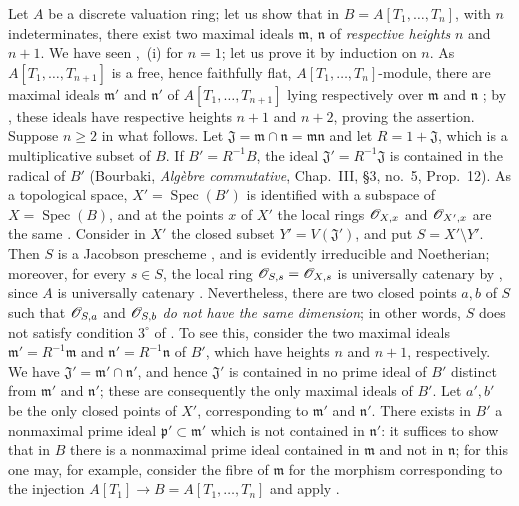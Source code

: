 \begin{env}[10.7.3]
\label{IV.10.7.3}
Let $A$ be a discrete valuation ring; let us show that in $B=A[T_1,\ldots,T_n]$, with $n$ indeterminates, there exist two maximal ideals $\mathfrak{m}$, $\mathfrak{n}$ of \emph{respective heights} $n$ and $n+1$.
We have seen ,~(i) for $n=1$; let us prove it by induction on $n$.
As $A[T_1,\ldots,T_{n+1}]$ is a free, hence faithfully flat, $A[T_1,\ldots,T_n]$-module, there are maximal ideals $\mathfrak{m}'$ and $\mathfrak{n}'$ of $A[T_1,\ldots,T_{n+1}]$ lying respectively over $\mathfrak{m}$ and $\mathfrak{n}$ ; by , these ideals have respective heights $n+1$ and $n+2$, proving the assertion.
Suppose $n\geq 2$ in what follows.
Let $\mathfrak{J}=\mathfrak{m}\cap\mathfrak{n}=\mathfrak{m}\mathfrak{n}$ and let $R=1+\mathfrak{J}$, which is a multiplicative subset of $B$.
If $B'=R^{-1}B$, the ideal $\mathfrak{J}'=R^{-1}\mathfrak{J}$ is contained in the radical of $B'$ (Bourbaki, \emph{Alg\`ebre commutative}, Chap.~III, \S3, no.~5, Prop.~12).
As a topological space, $X'=\operatorname{Spec}(B')$ is identified with a subspace of $X=\operatorname{Spec}(B)$, and at the points $x$ of $X'$ the local rings $\mathscr{O}_{X,x}$ and $\mathscr{O}_{X',x}$ are the same .
Consider in $X'$ the closed subset $Y'=V(\mathfrak{J}')$, and put $S=X'\setminus Y'$.
Then $S$ is a Jacobson prescheme , and is evidently irreducible and Noetherian; moreover, for every $s\in S$, the local ring $\mathscr{O}_{S,s}=\mathscr{O}_{X,s}$ is universally catenary by , since $A$ is universally catenary .
Nevertheless, there are two closed points $a,b$ of $S$ such that $\mathscr{O}_{S,a}$ and $\mathscr{O}_{S,b}$ \emph{do not have the same dimension}; in other words, $S$ does not satisfy condition $3^\circ$ of .
To see this, consider the two maximal ideals $\mathfrak{m}'=R^{-1}\mathfrak{m}$ and $\mathfrak{n}'=R^{-1}\mathfrak{n}$ of $B'$, which have heights $n$ and $n+1$, respectively.
We have $\mathfrak{J}'=\mathfrak{m}'\cap\mathfrak{n}'$, and hence $\mathfrak{J}'$ is contained in no prime ideal of $B'$ distinct from $\mathfrak{m}'$ and $\mathfrak{n}'$; these are consequently the only maximal ideals of $B'$.
Let $a',b'$ be the only closed points of $X'$, corresponding to $\mathfrak{m}'$ and $\mathfrak{n}'$.
There exists in $B'$ a nonmaximal prime ideal $\mathfrak{p}'\subset\mathfrak{m}'$ which is not contained in $\mathfrak{n}'$: it suffices to show that in $B$ there is a nonmaximal prime ideal contained in $\mathfrak{m}$ and not in $\mathfrak{n}$; for this one may, for example, consider the fibre of $\mathfrak{m}$ for the morphism corresponding to the injection $A[T_1]\longrightarrow B=A[T_1,\ldots,T_n]$ and apply .

\end{env}
